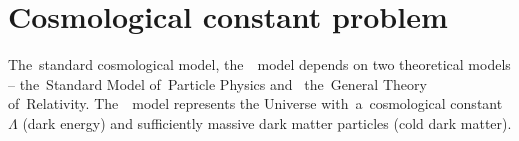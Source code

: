 \section{Cosmological constant problem}
The~standard cosmological model, the~\LCDM\ model depends on two theoretical models -- the~Standard Model of~Particle Physics and~ the~General Theory of~Relativity. The~\LCDM\ model represents the Universe with~a~cosmological constant \(\Lambda\) (dark energy) and sufficiently massive dark matter particles (cold dark matter).%




